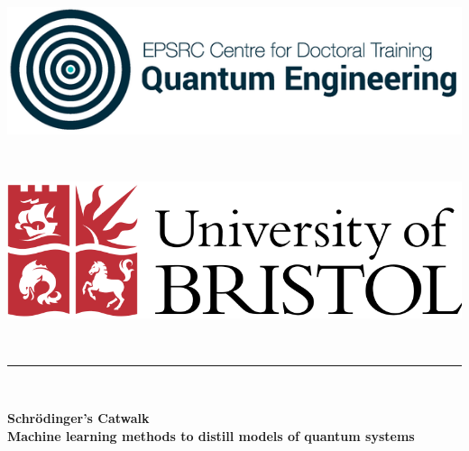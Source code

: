 \begin{titlepage}

    \newcommand{\HRule}{\rule{\linewidth}{0.5mm}} %
    
    \center %
     
    \vspace{1cm}
    \begin{minipage}{0.4\textwidth}
    \begin{flushleft} 
        \includegraphics[scale=2]{logos/qecdt.png}
    \end{flushleft}
    \end{minipage}
    ~
    \begin{minipage}{0.4\textwidth}
    \begin{flushright} \large
        \includegraphics[scale=0.2]{logos/bristol_uni.png}
    \end{flushright}
    \end{minipage}\\[1cm]
    
    \vspace{2cm}
    
    \vspace{1cm}
    \HRule \\[0.4cm]
    { \LARGE \bfseries Schr\"odinger's Catwalk \\
     \large  Machine learning methods to distill models of quantum systems
    
}
\end{titlepage}
